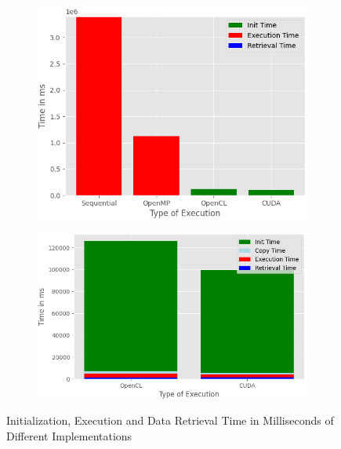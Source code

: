 \begin{figure}[htbp]
  \begin{center}
  \begin{subfigure}{0.48\textwidth}
    \includegraphics[width=\linewidth]{figures/results.png}
    \caption{ }
	\label{subfig:a}
  \end{subfigure}    
  \begin{subfigure}{0.48\textwidth}
    \includegraphics[width=\linewidth]{figures/GPUs_Time.png}
    \caption{ }
	\label{subfig:b}
  \end{subfigure}
    \caption{Initialization, Execution and Data Retrieval Time in Milliseconds of Different Implementations}
    \label{fig:time}
  \end{center}
\end{figure}

